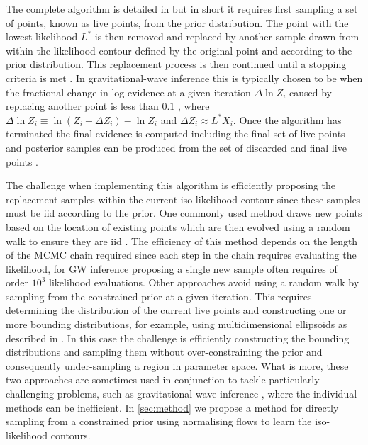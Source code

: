 \documentclass[%
 reprint,
nofootinbib,
 amsmath,amssymb,
 aps,
 prd,
]{revtex4-2}
\begin{document}
The complete algorithm is detailed in \cite{Skilling:2006} but in short it requires first sampling a set of points, known as live points, from the prior distribution. The point with the lowest likelihood $L^{*}$ is then removed and replaced by another sample drawn from within the likelihood contour defined by the original point and according to the prior distribution. This replacement process is then continued until a stopping criteria is met \cite{Skilling:2006}. In gravitational-wave inference this is typically chosen to be when the fractional change in log evidence at a given iteration $\Delta \ln Z_{i}$ caused by replacing another point is less than $0.1$ \cite{Veitch:2015}, where $\Delta \ln Z_{i} \equiv \ln \left(Z_{i} + \Delta Z_{i}\right) - \ln Z_{i}$ and $\Delta Z_{i} \approx L^{*} X_{i}$. Once the algorithm has terminated the final evidence is computed including the final set of live points and posterior samples can be produced from the set of discarded and final live points \cite{Skilling:2006}.

The challenge when implementing this algorithm is efficiently proposing the replacement samples within the current iso-likelihood contour since these samples must be \ac{iid} according to the prior. One commonly used method draws new points based on the location of existing points which are then evolved using a random walk to ensure they are \ac{iid} \cite{Veitch:2015,Veitch:2021cpnest}. The efficiency of this method depends on the length of the \ac{MCMC} chain required since each step in the chain requires evaluating the likelihood, for \ac{GW} inference proposing a single new sample often requires of order $10^{3}$ likelihood evaluations. Other approaches avoid using a random walk by sampling from the constrained prior at a given iteration. This requires determining the distribution of the current live points and constructing one or more bounding distributions, for example, using multidimensional ellipsoids as described in \cite{Feroz:2019multinest}. In this case the challenge is efficiently constructing the bounding distributions and sampling them without over-constraining the prior and consequently under-sampling a region in parameter space. What is more, these two approaches are sometimes used in conjunction \cite{Speagle:2020} to tackle particularly challenging problems, such as gravitational-wave inference \cite{Romero-Shaw:2020}, where the individual methods can be inefficient. In \cref{sec:method} we propose a method for directly sampling from a constrained prior using normalising flows to learn the iso-likelihood contours.
\end{document}
